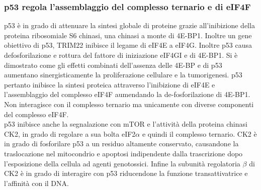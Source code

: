     \subsubsection{p53 regola l'assemblaggio del complesso ternario e di eIF4F}
    p53 \`e in grado di attenuare la sintesi globale di proteine grazie all'inibizione della proteina ribosomiale S6 chinasi, una chinasi a monte di 4E-BP1.
    Inoltre un gene obiettivo di p53, TRIM22 inibisce il legame di eIF4E a eIF4G.
    Inoltre p53 causa defosforilazione e rottura del fattore di iniziazione eIF4GI e di 4E-BP1.
    Si \`e dimostrato come gli effetti combinati dell'assenza delle 4E-BP e di p53 aumentano sinergisticamente la proliferazione cellulare e la tumorigenesi.
    p53 pertanto inibisce la sintesi proteica attraverso l'inibizione di eIF4E e l'assemblaggio del complesso eIF4F aumendando la de-fosforilazione di 4E-BP1.
    Non interagisce con il complesso ternario ma unicamente con diverse componenti del complesso eIF4F.\\
    p53 inibisce anche la segnalazione con mTOR e l'attivit\`a della proteina chinasi CK2, in grado di regolare a sua bolta eIF2$\alpha$ e quindi il complesso ternario.
    CK2 \`e in grado di fosforilare p53 a un residuo altamente conservato, causandone la traslocazione nel mitocondrio e apoptosi indipendente dalla trascrizione dopo l'esposizione della cellula ad agenti genotossici.
    Infine la subunit\`a regolatoria $\beta$ di CK2 \`e in grado di interagire con p53 riducendone la funzione transattivatrice e l'affinit\`a con il DNA.

